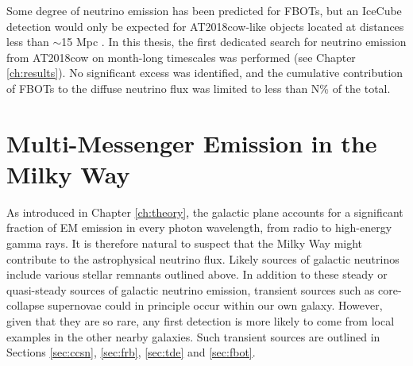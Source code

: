 Some degree of neutrino emission has been predicted for FBOTs, but an IceCube detection would only be expected for AT2018cow-like objects located at distances less than $\sim$15 Mpc . In this thesis, the first dedicated search for neutrino emission from AT2018cow on month-long timescales was performed (see Chapter \ref{ch:results}). No significant excess was identified, and the cumulative contribution of FBOTs to the diffuse neutrino flux was limited to less than N\% of the total.

\section{Multi-Messenger Emission in the Milky Way}

As introduced in Chapter \ref{ch:theory}, the galactic plane accounts for a significant fraction of EM emission in every photon wavelength, from radio to high-energy gamma rays. It is therefore natural to suspect that the Milky Way might contribute to the astrophysical neutrino flux. Likely sources of galactic neutrinos include various stellar remnants outlined above. In addition to these steady or quasi-steady sources of galactic neutrino emission, transient sources such as core-collapse supernovae could in principle occur within our own galaxy. However, given that they are so rare, any first detection is more likely to come from local examples in the other nearby galaxies. Such transient sources are outlined in Sections \ref{sec:ccsn}, \ref{sec:frb}, \ref{sec:tde} and \ref{sec:fbot}. 

